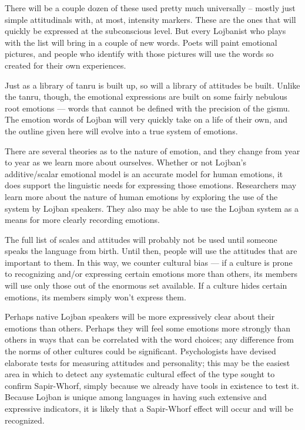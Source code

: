 There will be a couple dozen of these used pretty much
    universally -- mostly just simple attitudinals with, at most,
    intensity markers. These are the ones that will quickly be
    expressed at the subconscious level. But every Lojbanist who
    plays with the list will bring in a couple of new words. Poets
    will paint emotional pictures, and people who identify with
    those pictures will use the words so created for their own
    experiences.

Just as a library of tanru is built up, so will a library of
    attitudes be built. Unlike the tanru, though, the emotional
    expressions are built on some fairly nebulous root emotions ---
    words that cannot be defined with the precision of the gismu.
    The emotion words of Lojban will very quickly take on a life of
    their own, and the outline given here will evolve into a true
    system of emotions.

There are several theories as to the nature of emotion, and
    they change from year to year as we learn more about ourselves.
    Whether or not Lojban's additive/scalar emotional model is an
    accurate model for human emotions, it does support the
    linguistic needs for expressing those emotions. Researchers may
    learn more about the nature of human emotions by exploring the
    use of the system by Lojban speakers. They also may be able to
    use the Lojban system as a means for more clearly recording
    emotions.

The full list of scales and attitudes will probably not be
    used until someone speaks the language from birth. Until then,
    people will use the attitudes that are important to them. In
    this way, we counter cultural bias --- if a culture is prone to
    recognizing and/or expressing certain emotions more than
    others, its members will use only those out of the enormous set
    available. If a culture hides certain emotions, its members
    simply won't express them.

Perhaps native Lojban speakers will be more expressively
    clear about their emotions than others. Perhaps they will feel
    some emotions more strongly than others in ways that can be
    correlated with the word choices; any difference from the norms
    of other cultures could be significant. Psychologists have
    devised elaborate tests for measuring attitudes and
    personality; this may be the easiest area in which to detect
    any systematic cultural effect of the type sought to confirm
    Sapir-Whorf, simply because we already have tools in existence
    to test it. Because Lojban is unique among languages in having
    such extensive and expressive indicators, it is likely that a
    Sapir-Whorf effect will occur and will be recognized.

